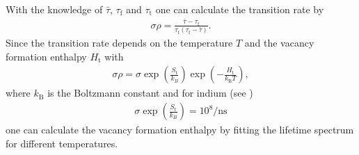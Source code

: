 With the knowledge of $\bar{\tau}$, $\tau_\mathrm{f}$ and $\tau_\mathrm{t}$ one can calculate the transition rate by
\begin{align}
  \sigma \rho= \frac{\bar{\tau}-\tau_\mathrm{f}}{\tau_\mathrm{f}(\tau_\mathrm{f}-\bar{\tau})}.
\label{eq:transition_rate}
\end{align}
Since the transition rate depends on the temperature $T$ and the vacancy formation enthalpy $H_\mathrm{t}$ with
\begin{align}
  \sigma \rho=\sigma \exp\left(\frac{S_\mathrm{t}}{k_B}\right)\exp\left({-\frac{H_\mathrm{t}}{k_\mathrm{B}T}}\right),
  \label{eq:enthalpy}	
\end{align}
where $k_\mathrm{B}$ is the Boltzmann constant and for indium (see \cite{weiler})
\begin{align*}
  \sigma \exp\left( \frac{S_\mathrm{t}}{k_B}\right)=10^8/\si{\nano\second}
\end{align*}
one can calculate the vacancy formation enthalpy by fitting the lifetime spectrum for different temperatures.

